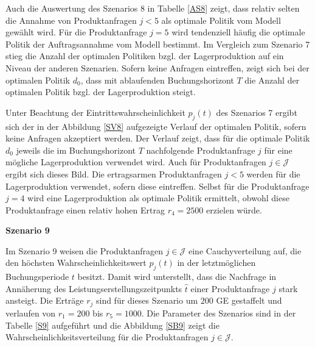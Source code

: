 Auch die Auswertung des Szenarios 8 in Tabelle \ref{AS8} zeigt, dass relativ selten die Annahme von Produktanfragen $j<5$ als optimale Politik vom Modell gewählt wird. Für die Produktanfrage $j=5$ wird tendenziell häufig die optimale Politik der Auftragsannahme vom Modell bestimmt. Im Vergleich zum Szenario 7 stieg die Anzahl der optimalen Politiken bzgl. der Lagerproduktion auf ein Niveau der anderen Szenarien. Sofern keine Anfragen eintreffen, zeigt sich bei der optimalen Politik $d_0$, dass mit ablaufenden Buchungshorizont $T$ die Anzahl der optimalen Politik bzgl. der Lagerproduktion steigt.

Unter Beachtung der Eintrittswahrscheinlichkeit $p_j(t)$ des Szenarios 7 ergibt sich der in der Abbildung \ref{SV8} aufgezeigte Verlauf der optimalen Politik, sofern keine Anfragen akzeptiert werden. Der Verlauf zeigt, dass für die optimale Politik $d_0$ jeweils die im Buchungshorizont $T$ nachfolgende Produktanfrage $j$ für eine mögliche Lagerproduktion verwendet wird. Auch für Produktanfragen $j\in\mathcal{J}$ ergibt sich dieses Bild. Die ertragsarmen Produktanfragen $j<5$ werden für die Lagerproduktion verwendet, sofern diese eintreffen. Selbst für die Produktanfrage $j=4$ wird eine Lagerproduktion als optimale Politik ermittelt, obwohl diese Produktanfrage einen relativ hohen Ertrag $r_4=2500$ erzielen würde.

\textbf{Szenario 9}

Im Szenario 9 weisen die Produktanfragen $j\in\mathcal{J}$ eine Cauchyverteilung auf, die den höchsten Wahrscheinlichkeitswert $p_j(t)$ in der letztmöglichen Buchungsperiode $t$ besitzt. Damit wird unterstellt, dass die Nachfrage in Annäherung des Leistungserstellungszeitpunkts $\hat t$ einer Produktanfrage $j$ stark ansteigt. Die Erträge $r_j$ sind für dieses Szenario um $200$ GE gestaffelt und verlaufen von $r_1=200$ bis $r_5=1000$. Die Parameter des Szenarios sind in der Tabelle \ref{S9} aufgeführt und die Abbildung \ref{SB9} zeigt die Wahrscheinlichkeitsverteilung für die Produktanfragen $j\in\mathcal{J}$. 

